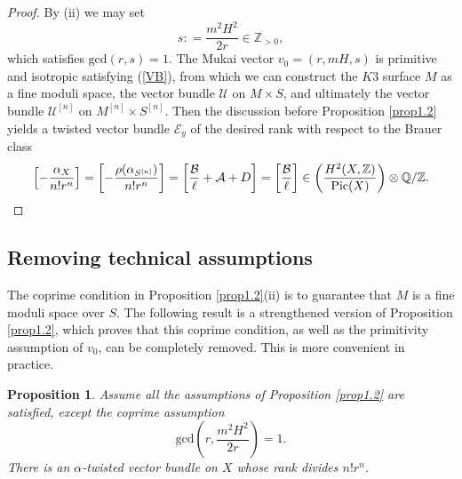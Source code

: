 \documentclass[11pt]{amsart}
\theoremstyle{plain}
\newtheorem{prop}[thm]{Proposition}
\theoremstyle{definition}
\theoremstyle{remark}
\newcommand{\BQ}{{\mathbb{Q}}}
\newcommand{\BZ}{{\mathbb{Z}}}
\newcommand{\CA}{{\mathcal A}}
\newcommand{\CB}{{\mathcal B}}
\newcommand{\CE}{{\mathcal E}}
\newcommand{\CU}{{\mathcal U}}
\begin{document}
\begin{proof}
By (ii) we may set 
\[
s: = \frac{m^2H^2}{2r} \in \BZ_{>0},
\]
which satisfies $\mathrm{gcd}(r,s) = 1$. 
The Mukai vector $v_0= (r, mH, s)$ is primitive and isotropic satisfying (\ref{VB}), from which we can construct the $K3$ surface $M$ as a fine moduli space, the vector bundle $\CU$ on $M\times S$, and ultimately the vector bundle $\CU^{[n]}$ on $M^{[n]}\times S^{[n]}$. Then the discussion before Proposition \ref{prop1.2} yields a twisted vector bundle $\CE_y$ of the desired rank with respect to the Brauer class
\[
\left[-\frac{\alpha_X}{n!r^n} \right] = \left[-\frac{\rho(\alpha_{S^{[n]}})}{n!r^n} \right] = \left[\frac{\CB}{\ell} +\CA +D \right] = \left[\frac{\CB}{\ell} \right] \in \left( \frac{H^2(X, \BZ)} {\mathrm{Pic}(X)}\right) \otimes \BQ/\BZ. \qedhere
\]
\end{proof}

\subsection{Removing  technical assumptions}

The coprime condition in Proposition \ref{prop1.2}(ii) is to guarantee that $M$ is a fine moduli space over $S$. The following result is a strengthened version of Proposition \ref{prop1.2}, which proves that this coprime condition, as well as the primitivity assumption of $v_0$, can be completely removed. This is more convenient in practice.

\begin{prop}\label{prop1.3}
   Assume all the assumptions of Proposition \ref{prop1.2} are satisfied, except the coprime assumption 
    \begin{equation}\label{coprime}
    \mathrm{gcd}\left(r, \frac{m^2H^2}{2r}\right)=1.
    \end{equation}
    There is an $\alpha$-twisted vector bundle on $X$ whose rank divides $n!r^n$.
\end{prop}
\end{document}
